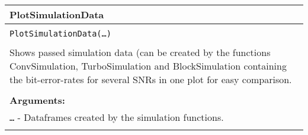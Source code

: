 \begin{longtable}{|p{\textwidth}|}
\hline
\rowcolor{lightblue}PlotSimulationData\\
\hline
\\
\texttt{PlotSimulationData(\dots)}\\
\\
Shows passed simulation data (can be created by the functions ConvSimulation, TurboSimulation and BlockSimulation containing the bit-error-rates for several SNRs in one plot for easy comparison.\\
\\
\textbf{Arguments:}\\
\texttt{\dots} - Dataframes created by the simulation functions.\\	
\\
\hline
\end{longtable}